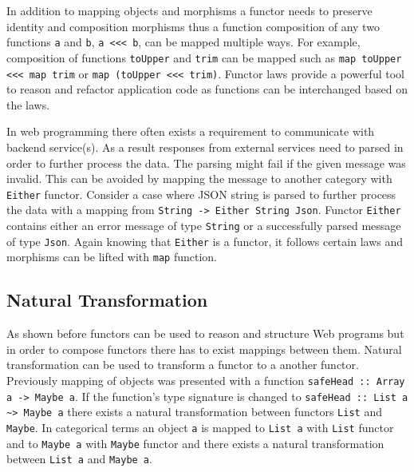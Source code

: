 \documentclass[article]{aaltoseries}
\begin{document}
    In addition to mapping objects and morphisms a functor needs to preserve
    identity and composition morphisms thus a function composition of any two
    functions \lstinline|a| and \lstinline|b|, \lstinline|a <<< b|, can be
    mapped multiple ways. For example, composition of functions
    \lstinline|toUpper| and \lstinline|trim| can be mapped such as
    \lstinline|map toUpper <<< map trim| or \lstinline|map (toUpper <<< trim)|.
    Functor laws provide a powerful tool to reason and refactor application code
    as functions can be interchanged based on the laws.

    In web programming there often exists a requirement to communicate with
    backend service(s). As a result responses from external services need to
    parsed in order to further process the data. The parsing might fail if the
    given message was invalid. This can be avoided by mapping the message to
    another category with \lstinline|Either| functor. Consider a case where JSON
    string is parsed to further process the data with a mapping from
    \lstinline|String -> Either String Json|. Functor \lstinline|Either|
    contains either an error message of type \lstinline|String| or a
    successfully parsed message of type \lstinline|Json|. Again knowing that
    \lstinline|Either| is a functor, it follows certain laws and morphisms can
    be lifted with \lstinline|map| function.



  \subsection{Natural Transformation}
    As shown before functors can be used to reason and structure Web programs
    but in order to compose functors there has to exist mappings between them.
    Natural transformation can be used to transform a functor to a another
    functor. Previously mapping of objects was presented with a function
    \lstinline|safeHead :: Array a -> Maybe a|. If the function’s type signature
    is changed to \lstinline|safeHead :: List a ~> Maybe a| there exists a
    natural transformation between functors \lstinline|List| and
    \lstinline|Maybe|. In categorical terms an object \lstinline|a| is mapped to
    \lstinline|List a| with \lstinline|List| functor and to \lstinline|Maybe a| with
    \lstinline|Maybe| functor and there exists a natural transformation between
    \lstinline|List a| and \lstinline|Maybe a|.
\end{document}
